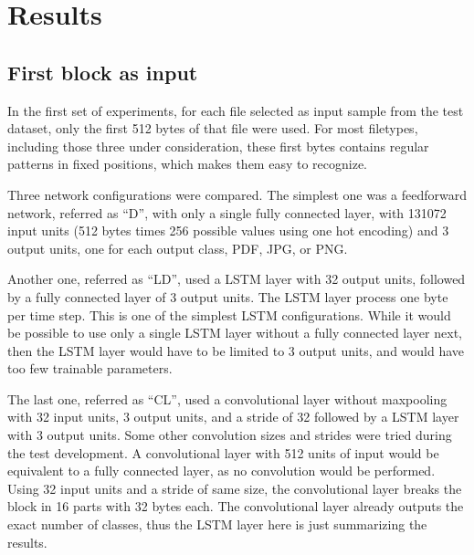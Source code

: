 \section{Results}




\subsection{First block as input}
In the first set of experiments, for each file selected as input sample from the test dataset, only the first 512 bytes of that file were used. For most filetypes, including those three under consideration, these first bytes contains regular patterns in fixed positions, which makes them easy to recognize.



Three network configurations were compared. The simplest one was a feedforward network, referred as ``D'', with only a single fully connected layer, with 131072 input units (512 bytes times 256 possible values using one hot encoding) and 3 output units, one for each output class, PDF, JPG, or PNG.

Another one, referred as ``LD'', used a LSTM layer with 32 output units, followed by a fully connected layer of 3 output units. The LSTM layer process one byte per time step. This is one of the simplest LSTM configurations. While it would be possible to use only a single LSTM layer without a fully connected layer next, then the LSTM layer would have to be limited to 3 output units, and would have too few trainable parameters. 

The last one, referred as ``CL'', used a convolutional layer without maxpooling with 32 input units, 3 output units, and a stride of 32 followed by a LSTM layer with 3 output units. Some other convolution sizes and strides were tried during the test development. A convolutional layer with 512 units of input would be equivalent to a fully connected layer, as no convolution would be performed. Using 32 input units and a stride of same size, the convolutional layer breaks the block in 16 parts with 32 bytes each. The convolutional layer already outputs the exact number of classes, thus the LSTM layer here is just summarizing the results.

